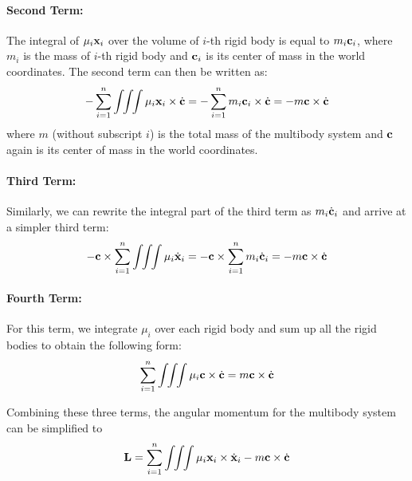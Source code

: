 \paragraph{Second Term:} The integral of $\mu_i \mathbf{x}_i$ over the
volume of $i$-th rigid body is equal to $m_i \mathbf{c}_i$, where
$m_i$ is the mass of $i$-th rigid body and $\mathbf{c}_i$ is its
center of mass in the world coordinates. The second term can then be
written as:
\begin{equation}
-\sum_{i=1}^n \int \!\! \int \!\! \int \mu_i \mathbf{x}_i \times
\dot{\mathbf{c}} = -\sum_{i=1}^n m_i \mathbf{c}_i \times \dot{\mathbf{c}} = -m
\mathbf{c} \times \dot{\mathbf{c}}
\end{equation}
where $m$ (without subscript $i$) is the total mass of the multibody system and $\mathbf{c}$ again
is its center of mass in the world coordinates.

\paragraph{Third Term:} Similarly, we can rewrite the integral part of the
third term as $m_i \dot{\mathbf{c}}_i$ and arrive at a simpler third term:
\begin{equation}
-\mathbf{c} \times \sum_{i=1}^n \int \!\! \int \!\! \int \mu_i
\dot{\mathbf{x}}_i = -\mathbf{c} \times \sum_{i=1}^n m_i \dot{\mathbf{c}}_i = -m
\mathbf{c} \times \dot{\mathbf{c}}
\end{equation}

\paragraph{Fourth Term:} For this term, we integrate $\mu_i$ over each rigid body and
sum up all the rigid bodies to obtain the following form:
\begin{equation}
\sum_{i=1}^n \int \!\! \int \!\! \int \mu_i \mathbf{c} \times
\dot{\mathbf{c}} = m \mathbf{c} \times \dot{\mathbf{c}}
\end{equation}

Combining these three terms, the angular momentum for the multibody
system can be simplified to 
\begin{equation}
\mathbf{L} = \sum_{i=1}^n \int \!\! \int \!\! \int \mu_i \mathbf{x}_i \times
\dot{\mathbf{x}}_i - m \mathbf{c} \times \dot{\mathbf{c}}
\end{equation}

